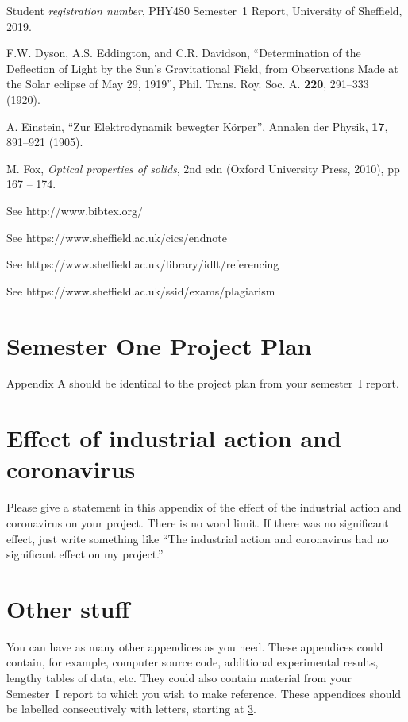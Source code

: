 \documentclass[aps,pra,twocolumn]{revtex4-2}
\begin{document}
\begin{thebibliography}{99}

Student \textit{registration number}, PHY480 Semester~1 Report, University of Sheffield, 2019.

F.W. Dyson, A.S. Eddington, and C.R. Davidson, ``Determination of the Deflection of Light by the Sun's Gravitational Field, from Observations Made at the Solar eclipse of May 29, 1919'', Phil. Trans. Roy. Soc. A. \textbf{220}, 291--333 (1920).

A. Einstein, ``Zur Elektrodynamik bewegter K\"{o}rper'', Annalen der Physik, \textbf{17}, 891--921 (1905).


M. Fox, \textit{Optical properties of solids}, 2nd edn (Oxford University Press, 2010), pp 167 -- 174.


See http://www.bibtex.org/ 

See https://www.sheffield.ac.uk/cics/endnote

See https://www.sheffield.ac.uk/library/idlt/referencing

See https://www.sheffield.ac.uk/ssid/exams/plagiarism




\end{thebibliography}



\appendix

\section{Semester One Project Plan}
\label{App:project plan}
Appendix A  should be identical to the project plan from your semester~I report. 

\section{Effect of industrial action and coronavirus}
\label{2020 special}
Please give a statement in this appendix of the effect of the industrial action and coronavirus on your project. There is no word limit. If there was no significant effect, just write something like ``The industrial action and coronavirus had no significant effect on my project.''


\section{Other stuff}
\label{other appendices}
You can have as many other appendices as you need. These appendices could contain, for example, computer source code, additional experimental results, lengthy tables of data, etc.  They could also contain material from your Semester~I report to which you wish to make reference. These appendices should be labelled consecutively with letters, starting at \ref{other appendices}.
\end{document}
